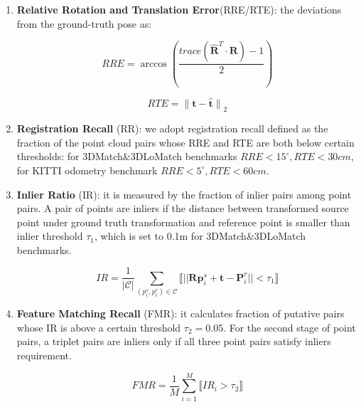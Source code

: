 \documentclass[conference,compsoc]{IEEEtran}
\begin{document}
\begin{enumerate}[label=(\alph*)]
\item \textbf{Relative Rotation and Translation Error}(RRE/RTE): the deviations from the ground-truth pose as:

\begin{equation}
RRE = \arccos(\frac{trace(\hat{\textbf{R}}^{T}{\cdot}\textbf{R}) - 1}{2})
\end{equation}

\begin{equation}
RTE = {\lVert \textbf{t} - \hat{\textbf{t}} \rVert}_{2}
\end{equation}

\item \textbf{Registration Recall} (RR): we adopt registration recall defined as the fraction of the point cloud pairs whose RRE and RTE are both below certain thresholds: for 3DMatch\&3DLoMatch benchmarks ${RRE < 15^{\circ}, RTE < 30cm}$, for KITTI odometry benchmark ${RRE < 5^{\circ}, RTE < 60cm}$. 




\item \textbf{Inlier Ratio} (IR): it is measured by the fraction of inlier pairs among point pairs. A pair of points are inliers if the distance between transformed source point under ground truth transformation and reference point is smaller than inlier threshold ${\tau_{1}}$, which is set to 0.1m for 3DMatch\&3DLoMatch benchmarks.

\begin{equation}
   IR = \frac{1}{|\mathcal{C}|}{\sum_{(p_i^{s},p_i^{r})\in\mathcal{C}}{{\llbracket} || \textbf{R} \textbf{p}_{i}^{s} + \textbf{t} - \textbf{P}_{i}^{r}||<\tau_{1} {\rrbracket}}}
\end{equation}

\item \textbf{Feature Matching Recall} (FMR): it calculates fraction of putative pairs whose IR is above a certain threshold ${\tau_2 = 0.05}$. For the second stage of point pairs, a triplet pairs are inliers only if all three point pairs satisfy inliers requirement.

\begin{equation}
   FMR = \frac{1}{M}\sum_{i=1}^{M}{{\llbracket} IR_i > \tau_2 {\rrbracket}}
\end{equation}

\end{enumerate}
\end{document}
